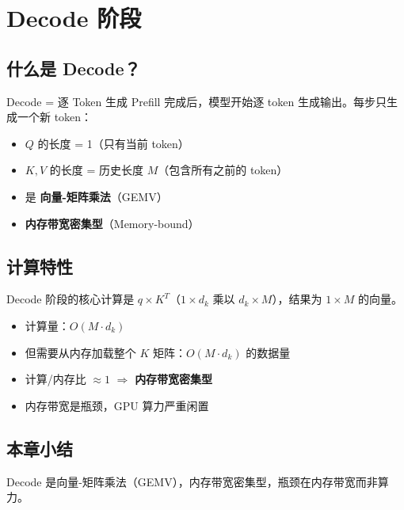 \section{Decode 阶段}

\subsection{什么是 Decode？}

\begin{importantbox}{Decode = 逐 Token 生成}
Prefill 完成后，模型开始逐 token 生成输出。每步只生成一个新 token：
\begin{itemize}
  \item $Q$ 的长度 = 1（只有当前 token）
  \item $K, V$ 的长度 = 历史长度 $M$（包含所有之前的 token）
  \item 是 \textbf{向量-矩阵乘法}（GEMV）
  \item \textbf{内存带宽密集型}（Memory-bound）
\end{itemize}
\end{importantbox}

\subsection{计算特性}

Decode 阶段的核心计算是 $q \times K^T$（$1 \times d_k$ 乘以 $d_k \times M$），结果为 $1 \times M$ 的向量。

\begin{itemize}
  \item 计算量：$O(M \cdot d_k)$
  \item 但需要从内存加载整个 $K$ 矩阵：$O(M \cdot d_k)$ 的数据量
  \item 计算/内存比 $\approx 1$ $\Rightarrow$ \textbf{内存带宽密集型}
  \item 内存带宽是瓶颈，GPU 算力严重闲置
\end{itemize}

\subsection{本章小结}

Decode 是向量-矩阵乘法（GEMV），内存带宽密集型，瓶颈在内存带宽而非算力。


